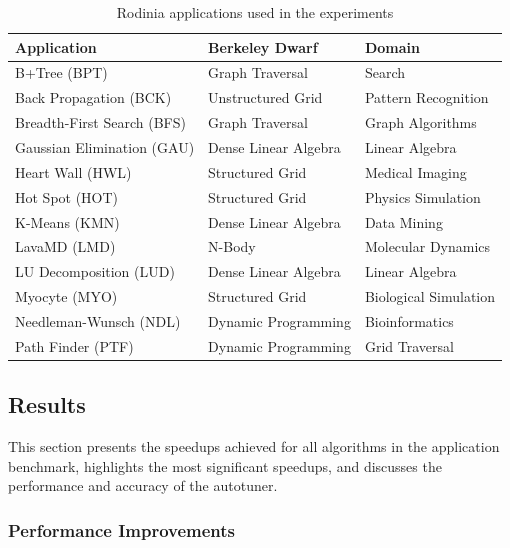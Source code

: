\begin{table}[htpb]
    \centering
    \footnotesize
        \begin{tabular}{lll}
            \toprule
            \textbf{Application} & \textbf{Berkeley Dwarf\cite{asanovic2009view}} & \textbf{Domain} \\\midrule
            B+Tree (BPT) & Graph Traversal& Search \\
            Back Propagation (BCK) & Unstructured Grid & Pattern Recognition \\
            Breadth-First Search (BFS) & Graph Traversal & Graph Algorithms \\
            Gaussian Elimination (GAU) & Dense Linear Algebra & Linear Algebra \\
            Heart Wall (HWL) & Structured Grid & Medical Imaging \\
            Hot Spot (HOT) & Structured Grid & Physics Simulation \\
            K-Means (KMN) & Dense Linear Algebra & Data Mining \\
            LavaMD (LMD) & N-Body & Molecular Dynamics \\
            LU Decomposition (LUD) & Dense Linear Algebra & Linear Algebra \\
            Myocyte (MYO) & Structured Grid & Biological Simulation \\
            Needleman-Wunsch (NDL) & Dynamic Programming & Bioinformatics \\
            Path Finder (PTF) & Dynamic Programming & Grid Traversal \\\bottomrule
        \end{tabular}
    \caption{Rodinia applications used in the experiments}
    \label{tab:Rodinia}
\end{table}

\subsection{Results}
\label{sec:GPUresults}

This section presents the speedups achieved for all algorithms in the
application benchmark, highlights the most significant speedups, and discusses
the performance and accuracy of the autotuner.

\subsubsection{Performance Improvements}

